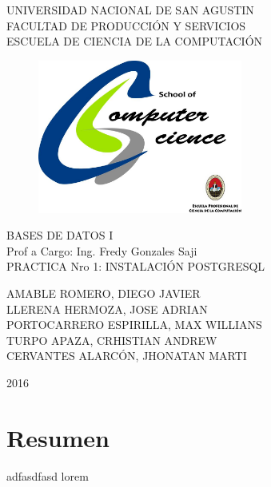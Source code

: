 \documentclass[10pt, a4paper]{article}
\begin{document}
\thispagestyle{empty}
\begin{center}
\Large
UNIVERSIDAD NACIONAL DE SAN AGUSTIN\\
FACULTAD DE PRODUCCIÓN Y SERVICIOS\\
ESCUELA DE CIENCIA DE LA COMPUTACIÓN\\

\vspace{1.5cm}
\begin{figure}[hb]
	\centering
	\includegraphics[width=0.6\textwidth]{jpg/logoCS_UNSA.jpg}
\end{figure}

BASES DE DATOS I\\
Prof a Cargo: Ing. Fredy Gonzales Saji\\
\vspace{1cm}
PRACTICA Nro 1: INSTALACIÓN POSTGRESQL

\vspace{2cm}

AMABLE ROMERO, DIEGO JAVIER\\
LLERENA HERMOZA, JOSE ADRIAN\\
PORTOCARRERO ESPIRILLA, MAX WILLIANS\\
TURPO APAZA, CRHISTIAN ANDREW\\
CERVANTES ALARCÓN, JHONATAN MARTI\\

\vfill

2016
\end{center}

\newpage
\thispagestyle{empty}

\section{Resumen}
\paragraph{}
adfasdfasd lorem
\end{document}
